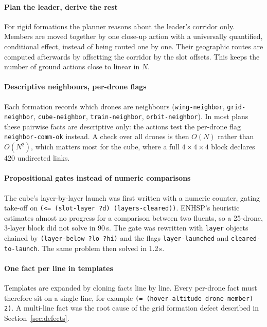 \documentclass[11pt,a4paper,oneside]{report}
\newcommand{\code}[1]{\texttt{#1}}
\begin{document}
\paragraph{Plan the leader, derive the rest}
For rigid formations the planner reasons about the leader's corridor only. Members are moved
together by one close-up action with a universally quantified, conditional effect, instead of
being routed one by one. Their geographic routes are computed afterwards by offsetting the
corridor by the slot offsets. This keeps the number of ground actions close to linear in $N$.

\paragraph{Descriptive neighbours, per-drone flags}
Each formation records which drones are neighbours (\code{wing-neighbor}, \code{grid-neighbor},
\code{cube-neighbor}, \code{train-neighbor}, \code{orbit-neighbor}). In most plans these pairwise
facts are descriptive only: the actions test the per-drone flag \code{neighbor-comm-ok} instead.
A check over all drones is then $O(N)$ rather than $O(N^2)$, which matters most for the cube,
where a full $4\times4\times4$ block declares 420 undirected links.

\paragraph{Propositional gates instead of numeric comparisons}
The cube's layer-by-layer launch was first written with a numeric counter, gating take-off on
\code{(<= (slot-layer ?d) (layers-cleared))}. ENHSP's heuristic estimates almost no progress for
a comparison between two fluents, so a 25-drone, 3-layer block did not solve in 90\,s. The
gate was rewritten with \code{layer} objects chained by \code{(layer-below ?lo ?hi)} and the flags
\code{layer-launched} and \code{cleared-to-launch}. The same problem then solved in 1.2\,s.

\paragraph{One fact per line in templates}
Templates are expanded by cloning facts line by line. Every per-drone fact must therefore sit on
a single line, for example \code{(= (hover-altitude drone-member) 2)}. A multi-line fact was the
root cause of the grid formation defect described in Section~\ref{sec:defects}.

\end{document}
